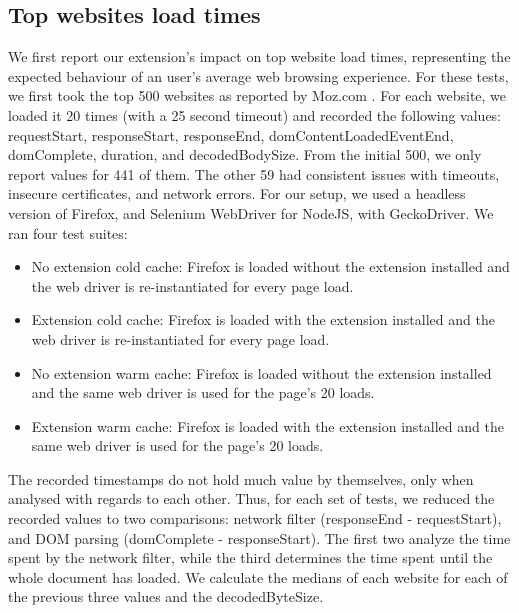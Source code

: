 \subsection{Top websites load times}
We first report our extension's impact on top website load times, representing the expected behaviour of an user's average web browsing experience. For these tests, we first took the top 500 websites as reported by Moz.com \cite{top500}. For each website, we loaded it 20 times (with a 25 second timeout) and recorded the following values: requestStart, responseStart, responseEnd, domContentLoadedEventEnd, domComplete, duration, and decodedBodySize. From the initial 500, we only report values for 441 of them. The other 59 had consistent issues with timeouts, insecure certificates, and network errors. For our setup, we used a headless version of Firefox, and Selenium WebDriver for NodeJS, with GeckoDriver. We ran four test suites:
\begin{itemize}
	\item No extension cold cache: Firefox is loaded without the extension installed and the web driver is re-instantiated for every page load.
	\item Extension cold cache: Firefox is loaded with the extension installed and the web driver is re-instantiated for every page load.
	\item No extension warm cache: Firefox is loaded without the extension installed and the same web driver is used for the page's 20 loads.
	\item Extension warm cache: Firefox is loaded with the extension installed and the same web driver is used for the page's 20 loads.
\end{itemize}

The recorded timestamps do not hold much value by themselves, only when analysed with regards to each other. Thus, for each set of tests, we reduced the recorded values to two comparisons: network filter (responseEnd - requestStart), and DOM parsing (domComplete - responseStart). The first two analyze the time spent by the network filter, while the third determines the time spent until the whole document has loaded. We calculate the medians of each website for each of the previous three values and the decodedByteSize.

